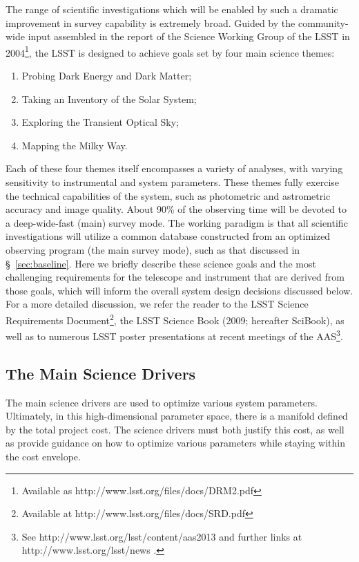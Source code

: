 \documentclass{emulateapj}
\newcommand{\B}[1]{{#1}}
\begin{document}
The range of scientific investigations which will be enabled by such a 
dramatic improvement in survey capability is extremely broad. Guided by
the community-wide input assembled in the report of the Science Working Group of the
LSST in 2004\footnote{Available as 
http://www.lsst.org/files/docs/DRM2.pdf}, the LSST is designed to 
achieve goals set by four main science themes:

\begin{enumerate}
\item Probing Dark Energy and Dark Matter;
\item Taking an Inventory of the Solar System;
\item Exploring the Transient Optical Sky;
\item Mapping the Milky Way.
\end{enumerate}

Each of these four themes itself encompasses a variety of analyses, with 
varying sensitivity to instrumental and system parameters. These themes 
fully exercise the technical capabilities of the system, such as photometric 
and astrometric accuracy and image quality. About 90\% of the observing time 
will be devoted to a deep-wide-fast (main) survey mode. The working paradigm is that all 
scientific investigations will utilize a common database constructed from an optimized 
observing program (the main survey mode), such as that discussed in
\S~\ref{sec:baseline}. 
Here we briefly describe these science goals and the most challenging requirements for the 
telescope and instrument that are derived from those goals, which will
inform the overall system design decisions discussed below.
For a more detailed discussion, we refer the reader to the LSST Science Requirements 
Document\footnote{Available at 
http://www.lsst.org/files/docs/SRD.pdf}, 
\B{the LSST Science Book}
(2009; hereafter SciBook),
as well as to numerous LSST poster presentations at recent
meetings of the AAS\footnote{See
http://www.lsst.org/lsst/content/aas2013 and further links at
http://www.lsst.org/lsst/news .}. 


\subsection{The Main Science Drivers }

The main science drivers are used to optimize various system parameters.
Ultimately, in this high-dimensional parameter space, there is a 
manifold defined by the total project cost. The science
drivers must both justify this cost, as well as provide guidance
on how to optimize various parameters while staying within the cost envelope.
\end{document}

